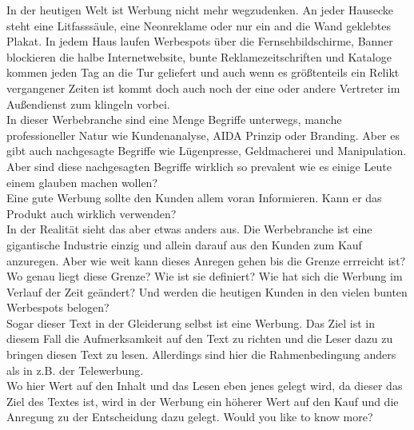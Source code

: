 \begin{refsection}
  
  
  In der heutigen Welt ist Werbung nicht mehr wegzudenken. An jeder Hausecke steht eine Litfasssäule, eine Neonreklame oder nur ein and die Wand geklebtes Plakat. In jedem Haus laufen Werbespots über die Fernsehbildschirme, Banner blockieren die halbe Internetwebsite, bunte Reklamezeitschriften und Kataloge kommen jeden Tag an die Tur geliefert und auch wenn es grö\ss{}tenteils ein Relikt vergangener Zeiten ist kommt doch auch noch der eine oder andere Vertreter im Au\ss{}endienst zum klingeln vorbei.\\
  In dieser Werbebranche sind eine Menge Begriffe unterwegs, manche professioneller Natur wie Kundenanalyse, AIDA Prinzip oder Branding. Aber es gibt auch nachgesagte Begriffe wie Lügenpresse, Geldmacherei und Manipulation. Aber sind diese nachgesagten Begriffe wirklich so prevalent wie es einige Leute einem glauben machen wollen?\\
  Eine gute Werbung sollte den Kunden allem voran Informieren. Kann er das Produkt auch wirklich verwenden?\\

  In der Realität sieht das aber etwas anders aus. Die Werbebranche ist eine gigantische Industrie einzig und allein darauf aus den Kunden zum Kauf anzuregen. Aber wie weit kann dieses Anregen gehen bis die Grenze errreicht ist? Wo genau liegt diese Grenze? Wie ist sie definiert? Wie hat sich die Werbung im Verlauf der Zeit geändert? Und werden die heutigen Kunden in den vielen bunten Werbespots belogen?\\
  Sogar dieser Text in der Gleiderung selbst ist eine Werbung. Das Ziel ist in diesem Fall die Aufmerksamkeit auf den Text zu richten und die Leser dazu zu bringen diesen Text zu lesen. Allerdings sind hier die Rahmenbedingung anders als in z.B. der Telewerbung.\\
  Wo hier Wert auf den Inhalt und das Lesen eben jenes gelegt wird, da dieser das Ziel des Textes ist, wird in der Werbung ein höherer Wert auf den Kauf und die Anregung zu der Entscheidung dazu gelegt. Would you like to know more?
  \clearpage
  \printbibliography[heading=subsubbibliography]
\end{refsection}
\clearpage
